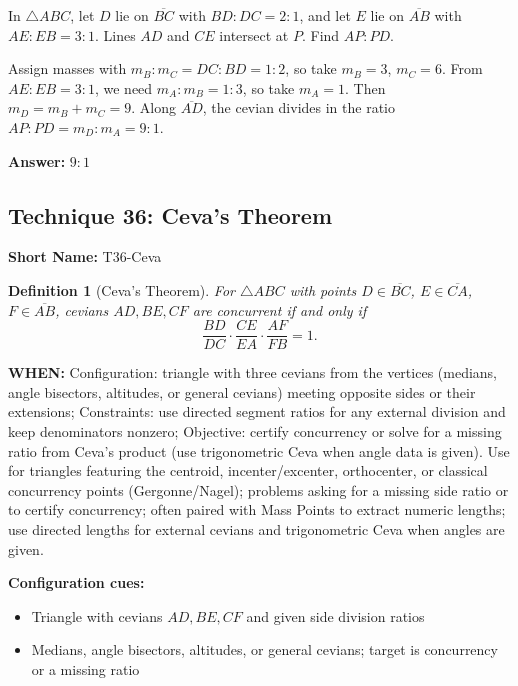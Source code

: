\documentclass[12pt]{article}
\newtheorem{definition}{Definition}[section]
\newenvironment{problem}[1]
{\begin{tcolorbox}[colback=blue!5!white,colframe=blue!75!black,title={#1}]}{\end{tcolorbox}}
\newenvironment{solution}
{\begin{tcolorbox}[colback=green!5!white,colframe=green!75!black,title={Solution}]}{\end{tcolorbox}}
\begin{document}
\begin{problem}{Example: Two Cevians Intersection Ratio}
In $\triangle ABC$, let $D$ lie on $\overline{BC}$ with $BD:DC = 2:1$, and let $E$ lie on $\overline{AB}$ with $AE:EB = 3:1$. Lines $AD$ and $CE$ intersect at $P$. Find $AP:PD$.
\end{problem}

\begin{solution}
Assign masses with $m_B:m_C = DC:BD = 1:2$, so take $m_B = 3$, $m_C = 6$. From $AE:EB = 3:1$, we need $m_A:m_B = 1:3$, so take $m_A = 1$. Then $m_D = m_B + m_C = 9$. Along $\overline{AD}$, the cevian divides in the ratio $AP:PD = m_D:m_A = 9:1$.

\textbf{Answer:} $9:1$
\end{solution}

\subsection{Technique 36: Ceva's Theorem}
\textbf{Short Name:} T36-Ceva

\begin{definition}[Ceva's Theorem]
For $\triangle ABC$ with points $D \in \overline{BC}$, $E \in \overline{CA}$, $F \in \overline{AB}$, cevians $AD, BE, CF$ are concurrent if and only if
\[
\frac{BD}{DC}\cdot\frac{CE}{EA}\cdot\frac{AF}{FB} = 1.
\]
\end{definition}

\textbf{WHEN:} Configuration: triangle with three cevians from the vertices (medians, angle bisectors, altitudes, or general cevians) meeting opposite sides or their extensions; Constraints: use directed segment ratios for any external division and keep denominators nonzero; Objective: certify concurrency or solve for a missing ratio from Ceva's product (use trigonometric Ceva when angle data is given). Use for triangles featuring the centroid, incenter/excenter, orthocenter, or classical concurrency points (Gergonne/Nagel); problems asking for a missing side ratio or to certify concurrency; often paired with Mass Points to extract numeric lengths; use directed lengths for external cevians and trigonometric Ceva when angles are given.

\textbf{Configuration cues:}
\begin{itemize}
    \item Triangle with cevians $AD, BE, CF$ and given side division ratios
    \item Medians, angle bisectors, altitudes, or general cevians; target is concurrency or a missing ratio
\end{itemize}
\end{document}
